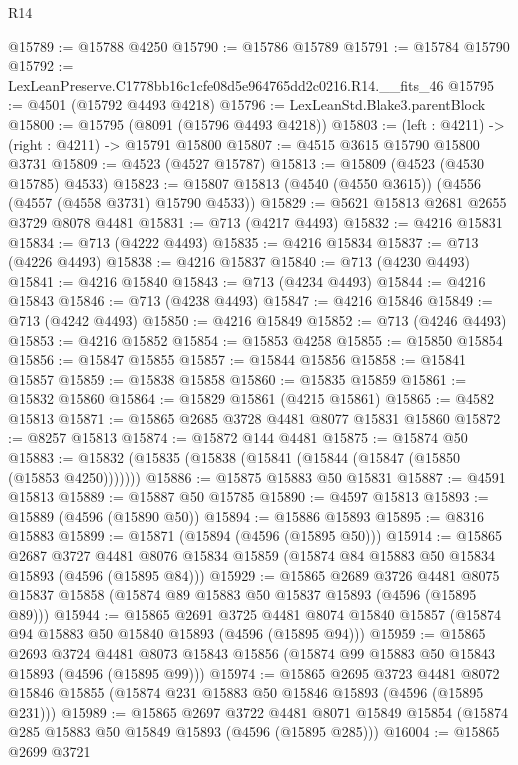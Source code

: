 \begin{lexlean}{R14}
\begin{coremodule}
@15789 := @15788 @4250
@15790 := @15786 @15789
@15791 := @15784 @15790
@15792 := LexLeanPreserve.C1778bb16c1cfe08d5e964765dd2c0216.R14.__fits_46
@15795 := @4501 (@15792 @4493 @4218)
@15796 := LexLeanStd.Blake3.parentBlock
@15800 := @15795 (@8091 (@15796 @4493 @4218))
@15803 := (left : @4211) -> (right : @4211) -> @15791 @15800
@15807 := @4515 @3615 @15790 @15800 @3731
@15809 := @4523 (@4527 @15787)
@15813 := @15809 (@4523 (@4530 @15785) @4533)
@15823 := @15807 @15813 (@4540 (@4550 @3615)) (@4556 (@4557 (@4558 @3731) @15790 @4533))
@15829 := @5621 @15813 @2681 @2655 @3729 @8078 @4481
@15831 := @713 (@4217 @4493)
@15832 := @4216 @15831
@15834 := @713 (@4222 @4493)
@15835 := @4216 @15834
@15837 := @713 (@4226 @4493)
@15838 := @4216 @15837
@15840 := @713 (@4230 @4493)
@15841 := @4216 @15840
@15843 := @713 (@4234 @4493)
@15844 := @4216 @15843
@15846 := @713 (@4238 @4493)
@15847 := @4216 @15846
@15849 := @713 (@4242 @4493)
@15850 := @4216 @15849
@15852 := @713 (@4246 @4493)
@15853 := @4216 @15852
@15854 := @15853 @4258
@15855 := @15850 @15854
@15856 := @15847 @15855
@15857 := @15844 @15856
@15858 := @15841 @15857
@15859 := @15838 @15858
@15860 := @15835 @15859
@15861 := @15832 @15860
@15864 := @15829 @15861 (@4215 @15861)
@15865 := @4582 @15813
@15871 := @15865 @2685 @3728 @4481 @8077 @15831 @15860
@15872 := @8257 @15813
@15874 := @15872 @144 @4481
@15875 := @15874 @50
@15883 := @15832 (@15835 (@15838 (@15841 (@15844 (@15847 (@15850 (@15853 @4250)))))))
@15886 := @15875 @15883 @50 @15831
@15887 := @4591 @15813
@15889 := @15887 @50 @15785
@15890 := @4597 @15813
@15893 := @15889 (@4596 (@15890 @50))
@15894 := @15886 @15893
@15895 := @8316 @15883
@15899 := @15871 (@15894 (@4596 (@15895 @50)))
@15914 := @15865
    @2687
    @3727
    @4481
    @8076
    @15834
    @15859
    (@15874 @84 @15883 @50 @15834 @15893 (@4596 (@15895 @84)))
@15929 := @15865
    @2689
    @3726
    @4481
    @8075
    @15837
    @15858
    (@15874 @89 @15883 @50 @15837 @15893 (@4596 (@15895 @89)))
@15944 := @15865
    @2691
    @3725
    @4481
    @8074
    @15840
    @15857
    (@15874 @94 @15883 @50 @15840 @15893 (@4596 (@15895 @94)))
@15959 := @15865
    @2693
    @3724
    @4481
    @8073
    @15843
    @15856
    (@15874 @99 @15883 @50 @15843 @15893 (@4596 (@15895 @99)))
@15974 := @15865
    @2695
    @3723
    @4481
    @8072
    @15846
    @15855
    (@15874 @231 @15883 @50 @15846 @15893 (@4596 (@15895 @231)))
@15989 := @15865
    @2697
    @3722
    @4481
    @8071
    @15849
    @15854
    (@15874 @285 @15883 @50 @15849 @15893 (@4596 (@15895 @285)))
@16004 := @15865
    @2699
    @3721

\end{coremodule}
\end{lexlean}
